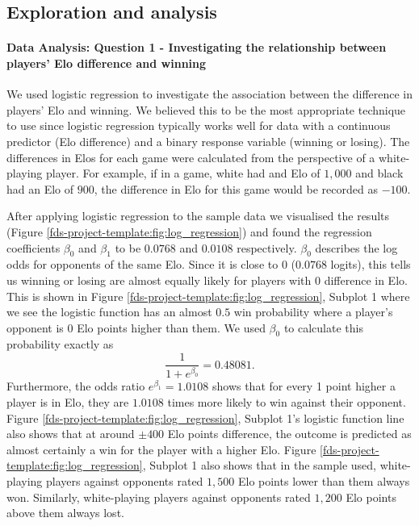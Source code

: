 \documentclass[10pt,a4paper]{article}
\begin{document}
\begin{multicols}{2}
\section{Exploration and  analysis}


\paragraph{Data Analysis: Question 1 - Investigating the relationship between players' Elo difference and winning}

We used logistic regression to investigate the association between the difference in players' Elo and winning. We believed this to be the most appropriate technique to use since logistic regression typically works well for data with a continuous predictor (Elo difference) and a binary response variable (winning or losing). The differences in Elos for each game were calculated from the perspective of a white-playing player. For example, if in a game, white had and Elo of $1,000$ and black had an Elo of $900$, the difference in Elo for this game would be recorded as $-100$. \newline

After applying logistic regression to the sample data we visualised the results (Figure \ref{fds-project-template:fig:log_regression}) and found the regression coefficients $\beta_{0}$ and $\beta_{1}$ to be $0.0768$ and $0.0108$ respectively. $\beta_{0}$ describes the log odds for opponents of the same Elo. Since it is close to $0$ ($0.0768$ logits), this tells us winning or losing are almost equally likely for players with $0$ difference in Elo. This is shown in Figure \ref{fds-project-template:fig:log_regression}, Subplot 1 where we see the logistic function has an almost $0.5$ win probability where a player's opponent is $0$ Elo points higher than them. We used $\beta_{0}$ to calculate this probability exactly as 
$$\displaystyle\frac{1}{1+e^{\beta_{0}}} = 0.48081.$$
Furthermore, the odds ratio $e^{\beta_{1}} = 1.0108$ shows that for every 1 point higher a player is in Elo, they are $1.0108$ times more likely to win against their opponent. Figure \ref{fds-project-template:fig:log_regression}, Subplot 1's logistic function line also shows that at around $\pm 400$ Elo points difference, the outcome is predicted as almost certainly a win for the player with a higher Elo. Figure \ref{fds-project-template:fig:log_regression}, Subplot 1 also shows that in the sample used, white-playing players against opponents rated $1,500$ Elo points lower than them always won. Similarly, white-playing players against opponents rated $1,200$ Elo points above them always lost. \newline


\end{multicols}
\end{document}
